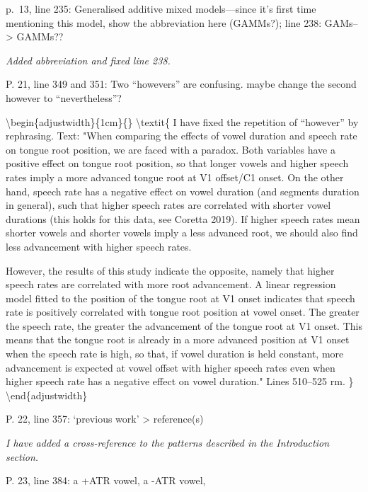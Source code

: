 \documentclass[]{article}
\begin{document}
p.~13, line 235: Generalised additive mixed models---since it's first
time mentioning this model, show the abbreviation here (GAMMs?); line
238: GAMs--\textgreater{} GAMMs??

\begin{adjustwidth}{1cm}{} \textit{
Added abbreviation and fixed line 238.
} \end{adjustwidth}

P. 21, line 349 and 351: Two ``howevers'' are confusing. maybe change
the second however to ``nevertheless''?

\textbackslash{}begin\{adjustwidth\}\{1cm\}\{\} \textbackslash{}textit\{
I have fixed the repetition of ``however'' by rephrasing. Text: "When
comparing the effects of vowel duration and speech rate on tongue root
position, we are faced with a paradox. Both variables have a positive
effect on tongue root position, so that longer vowels and higher speech
rates imply a more advanced tongue root at V1 offset/C1 onset. On the
other hand, speech rate has a negative effect on vowel duration (and
segments duration in general), such that higher speech rates are
correlated with shorter vowel durations (this holds for this data, see
Coretta 2019). If higher speech rates mean shorter vowels and shorter
vowels imply a less advanced root, we should also find less advancement
with higher speech rates.

However, the results of this study indicate the opposite, namely that
higher speech rates are correlated with more root advancement. A linear
regression model fitted to the position of the tongue root at V1 onset
indicates that speech rate is positively correlated with tongue root
position at vowel onset. The greater the speech rate, the greater the
advancement of the tongue root at V1 onset. This means that the tongue
root is already in a more advanced position at V1 onset when the speech
rate is high, so that, if vowel duration is held constant, more
advancement is expected at vowel offset with higher speech rates even
when higher speech rate has a negative effect on vowel duration." Lines
510--525 rm. \} \textbackslash{}end\{adjustwidth\}

P. 22, line 357: `previous work' \textgreater{} reference(s)

\begin{adjustwidth}{1cm}{} \textit{
I have added a cross-reference to the patterns described in the Introduction section.
} \end{adjustwidth}

P. 23, line 384: a +ATR vowel, a -ATR vowel,
\end{document}
